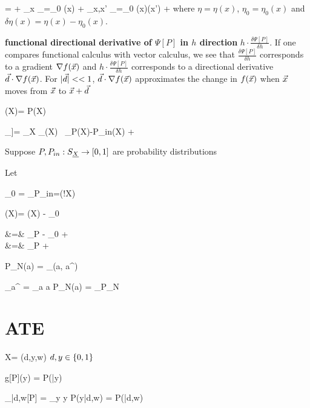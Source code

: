 \beq
\Psi[\eta]=
\Psi[\eta_0]
+ \sum_x
_{\eta=\eta_0}
\delta\eta(x)
+
\sum_{x,x'}
_{\eta=\eta_0}
\delta\eta(x)\delta\eta(x')
+
\cdots
\eeq
where
$ \eta =\eta(x)$,
$\eta_0=\eta_0(x)$ and $\delta \eta(x) = \eta(x)-\eta_0(x)$.



{\bf functional directional derivative of $\Psi[P]$ in $h$ direction}
$h\cdot\frac{\delta \Psi[P]}{\delta h}$.
If one compares functional calculus with vector calculus, we see that
$\frac{\delta \Psi[P]}{\delta h}$ corresponds to a gradient
$\nabla f({\vec{x}})$ and
$h\cdot \frac{\delta \Psi[P]}{\delta h}$
corresponds to a directional derivative
${\vec{d}}\cdot \nabla f({\vec{x}})$.
For $|{\vec{d}}|<<1$, ${\vec{d}}\cdot \nabla f({\vec{x}})$ approximates
the change
in $f({\vec{x}})$ when ${\vec{x}}$ moves from ${\vec{x}}$ to ${\vec{x}}+{\vec{d}}$

\beq
\cald[P](X)=
\frac{\delta \Psi[P]}
{\delta P(X)}
\eeq


\beq
\underbrace{\Psi[P] - \Psi[P_{in}]}_{\delta \Psi[P,P_{in}]}]=
\sum_X
_{\cald[P_{in}](X)}
\
_{P(X)-P_{in}(X)}
+
\calr[P, P_{in}]
\eeq

Suppose
$P,P_{in}: S_{\underline{X}}\rightarrow [0,1]$
are probability distributions

Let

\beq
\cald_0 = \av{\cald[P_{in}]}_{P_{in}}=\caln(!X)\in\RR
\eeq

\beq
\Delta\cald[P](X)= \cald[P](X) - \cald_0
\eeq

\beqa
\delta\Psi[P,P_{in}]&=&
\av{\cald[P_{in}]}_P - \cald_0
+
\calr[P, P_{in}]
\\
&=&
\av{\Delta\cald[P_{in}]}_P
+
\calr[P, P_{in}]
\eeqa



\beq
P_N(a) = \sum_\s\delta(a, a^\s)
\eeq

\beq
{}\sum_\s a^\s
=
\sum_a a P_N(a) = _{P_N}
\eeq

\section{ATE}




\beq
X= (d,y,w)
\eeq
$d,y\in \{0,1\}$

\beq
g[P](y) = P(|y)
\eeq

\beq
\caly_{|d,w}[P] = \sum_y y P(y|d,w) = P(|d,w)
\eeq

